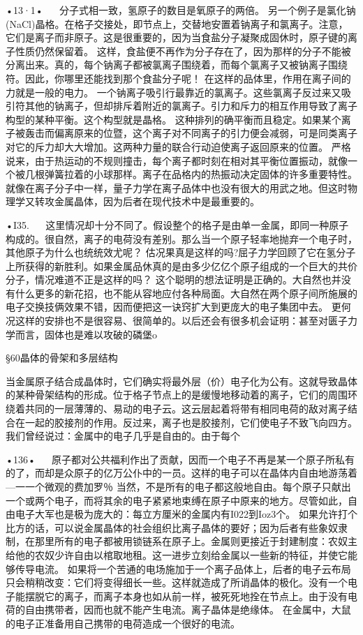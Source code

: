 •13·1•
  
分子式相一致，氢原子的数目是氧原子的两倍。
另一个例子是氯化钠(NaCl)晶格。在格子交接处，即节点上，交替地安置着钠离子和氯离子。注意，它们是离子而非原子。这是很重要的，因为当食盐分子凝聚成固休时，原子键的离子性质仍然保留着。
这样，食盐便不再作为分子存在了，因为那样的分子不能被分离出来。真的，每个钠离子都被氯离子围绕着，而每个氯离子又被钠离子围绕符。因此，你哪里还能找到那个食盐分子呢！
在这样的品体里，作用在离子间的力就是一般的电力。
一个钠离子吸引行最靠近的氯离子。这些氯离子反过来又吸引符其他的钠离子，但却排斥着附近的氯离子。引力和斥力的相互作用导致了离子构型的某种平衡。这个构型就是晶格。
这种排列的确平衡而且稳定。如果某个离子被轰击而偏离原来的位暨，这个离子对不同离子的引力便会减弱，可是同类离子对它的斥力却大大增加。这两种力量的联合行动迫使离子返回原来的位置。
严格说来，由于热运动的不规则撞击，每个离子都时刻在相对其平衡位置振动，就像一个被几根弹簧拉着的小球那样。离子在品格内的热振动决定固体的许多重要特性。
就像在离子分子中一样，量子力学在离子品体中也没有很大的用武之地。但这时物理学又转攻金属晶体，因为后者在现代技术中是最重要的。

•I35.
  
这里情况却十分不同了。假设整个的格子是由单一金属，即同一种原子构成的。很自然，离子的电荷没有差别。那么当一个原子轻率地抛弃一个电子时，其他原子为什么也统统效尤呢？
估况果真是这样的吗?屈子力学回顾了它在氢分子上所获得的新胜利。如果金属品休真的是由多少亿亿个原子组成的一个巨大的共价分子，情况难道不正是这样的吗？
这个聪明的想法证明是正确的。大自然也并没有什么更多的新花招，也不能从容地应付各种局面。大自然在两个原子间所施展的电子交换技俩效果不错，因而便把这一诀窍扩大到更庞大的电子集团中去。
更何况这样的安排也不是很容易、很简单的。以后还会有很多机会证明：甚至对匮子力学而言，固体也是难以攻破的磷堡o

§60晶体的骨架和多层结构

当金属原子结合成晶体时，它们确实将最外层（价）电子化为公有。这就导致晶体的某种骨架结构的形成。位于格子节点上的是缓慢地移动着的离子，它们的周围环绕着共同的一层薄薄的、易动的电子云。这云层起着将带有相同电荷的敌对离子结合在一起的胶接剂的作用。反过来，离子也是胶接剂，它们使电子不致飞向四方。
我们曾经说过：金属中的电子几乎是自由的。由于每个

•136•
  
原子都对公共福利作出了贡献，因而一个电子不再是某一个原子所私有的了，而却是众原子的亿万公仆中的一员。这样的电子可以在晶体内自由地游荡着—一一个微观的费加罗％
当然，不是所有的电子都这般地自由。每个原子只献出一个或两个电子，而将其余的电子紧紧地束缚在原子中原来的地方。尽管如此，自由电子大军也是极为庞大的：每立方厘米的金属内有I022到Ioz3个。
如果允许打个比方的话，可以说金属晶体的社会组织比离子晶体的要好；因为后者有些象奴隶制，在那里所有的电子都被用锁链系在原子上。金属则更接近于封建制度：农奴主给他的农奴少许自由以棺取地租。这一进步立刻给金属以一些新的特征，并使它能够传导电流。
如果将一个苦通的电场施加于一个离子品体上，后者的电子云布局只会稍稍改变：它们将变得细长一些。这样就造成了所诮晶体的极化。没有一个电子能摆脱它的离子，而离子本身也如从前一样，被死死地拴在节点上。由于没有电荷的自由携带者，因而也就不能产生电流。离子晶体是绝缘体。
在金属中，大鼠的电子正准备用自己携带的电荷造成一个很好的电流。

